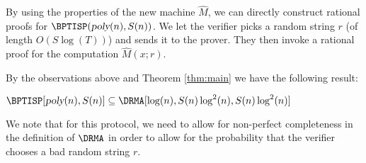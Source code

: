 By using the properties of the new machine $\hat{M}$, we can directly construct rational proofs for $\BPTISP(\poly(n), S(n))$.
We let the verifier picks a random string $r$ (of length $O(S \log(T))$) and sends it to the prover. They then invoke a rational
proof for the computation $\hat{M}(x;r)$.

By the observations above and Theorem \ref{thm:main} we have the following result:
\begin{corollary}
	$\BPTISP[\poly(n), S(n)] \subseteq \DRMA[\log(n), S(n) \log^2(n), S(n) \log^2(n)]$
\end{corollary}

We note that for this protocol, we need to allow for non-perfect completeness in the definition of $\DRMA$ in order to allow for the probability that the verifier chooses a bad random string $r$. 


